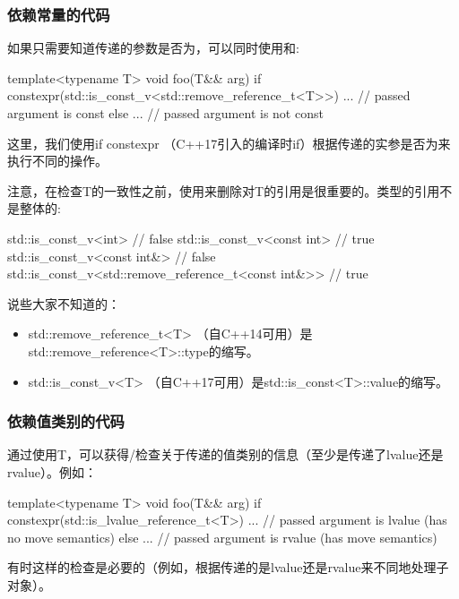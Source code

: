 \subsubsection{依赖常量的代码}

如果只需要知道传递的参数是否为，可以同时使用和:

\begin{cppcode}
template<typename T>
void foo(T&& arg)
{
	if constexpr(std::is_const_v<std::remove_reference_t<T>>) {
		... // passed argument is const
	}
	else {
		... // passed argument is not const
	}
}
\end{cppcode}

这里，我们使用if constexpr （C++17引入的编译时if）根据传递的实参是否为来执行不同的操作。

注意，在检查T的一致性之前，使用来删除对T的引用是很重要的。类型的引用不是整体的:

\begin{cppcode}
std::is_const_v<int> // false
std::is_const_v<const int> // true
std::is_const_v<const int&> // false
std::is_const_v<std::remove_reference_t<const int&>> // true
\end{cppcode}

说些大家不知道的：

\begin{itemize}
	\item std::remove_reference_t<T> （自C++14可用）是std::remove_reference<T>::type的缩写。
	\item std::is_const_v<T> （自C++17可用）是std::is_const<T>::value的缩写。
\end{itemize}

\subsubsection{依赖值类别的代码}

通过使用T，可以获得/检查关于传递的值类别的信息（至少是传递了lvalue还是rvalue）。例如：

\begin{cppcode}
template<typename T>
void foo(T&& arg)
{
	if constexpr(std::is_lvalue_reference_t<T>) {
		... // passed argument is lvalue (has no move semantics)
	}
	else {
		... // passed argument is rvalue (has move semantics)
	}
}
\end{cppcode}

有时这样的检查是必要的（例如，根据传递的是lvalue还是rvalue来不同地处理子对象）。

